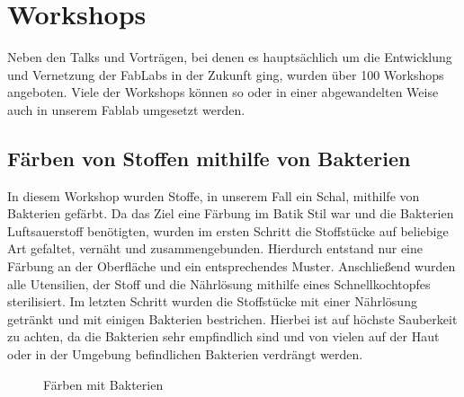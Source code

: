 \documentclass{\basedir/fablab-document}
\begin{document}
\section*{Workshops}

Neben den Talks und Vorträgen, bei denen es hauptsächlich um die
Entwicklung und Vernetzung der FabLabs in der Zukunft ging, wurden über
100 Workshops angeboten. Viele der Workshops können so oder in einer
abgewandelten Weise auch in unserem Fablab umgesetzt werden.

\subsection*{Färben von Stoffen mithilfe von Bakterien}

In diesem Workshop wurden Stoffe, in unserem Fall ein Schal, mithilfe
von Bakterien gefärbt. Da das Ziel eine Färbung im Batik Stil war und
die Bakterien Luftsauerstoff benötigten, wurden im ersten Schritt die
Stoffstücke auf beliebige Art gefaltet, vernäht und zusammengebunden.
Hierdurch entstand nur eine Färbung an der Oberfläche und ein
entsprechendes Muster. Anschließend wurden alle Utensilien, der Stoff
und die Nährlösung mithilfe eines Schnellkochtopfes sterilisiert. Im
letzten Schritt wurden die Stoffstücke mit einer Nährlösung getränkt und
mit einigen Bakterien bestrichen. Hierbei ist auf höchste Sauberkeit zu
achten, da die Bakterien sehr empfindlich sind und von vielen auf der
Haut oder in der Umgebung befindlichen Bakterien verdrängt werden.

\begin{figure}[h]
	\noindent{}
	\caption{Färben mit Bakterien}
	\label{faerben-von-stoffen-mithilfe-von-bakterien}
\end{figure}
\end{document}
